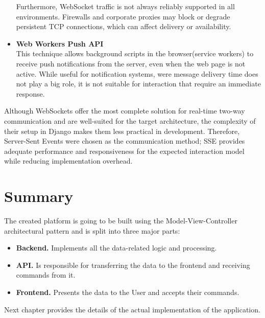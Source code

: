 \begin{itemize}
    Furthermore, WebSocket traffic is not always reliably supported in all environments.
    Firewalls and corporate proxies may block or degrade persistent TCP connections,
    which can affect delivery or availability.

    \item \textbf{Web Workers Push API} \\
    This technique allows background scripts in the browser(service workers) to receive push notifications from the server,
    even when the web page is not active.\cite{pushapi} While useful for notification systems, were message
    delivery time does not play a big role,
    it is not suitable for interaction that require an immediate response.
\end{itemize}

Although WebSockets offer the most complete solution for real-time two-way communication and are well-suited
for the target architecture, the complexity of their setup in Django makes them less practical in development.
Therefore, Server-Sent Events were chosen as the communication method;
SSE provides adequate performance and responsiveness for the expected interaction model while reducing implementation overhead.


\section{Summary}

The created platform is going to be built using the Model-View-Controller \cite{mvc} architectural pattern
and is split into three major parts:
\begin{itemize}
    \item \textbf{Backend.} Implements all the data-related logic and processing.
    \item \textbf{API.} Is responsible for transferring the data to the frontend and receiving commands from it.
    \item \textbf{Frontend.} Presents the data to the User and accepts their commands.
\end{itemize}

Next chapter  provides the details of the actual implementation of the application.